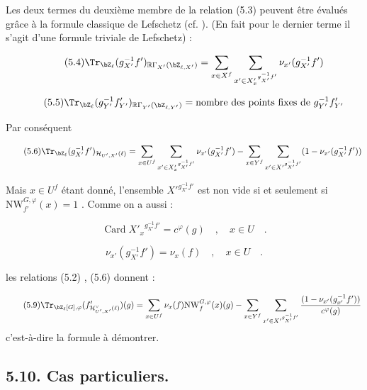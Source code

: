 Les deux termes du deuxième membre de la relation (5.3) peuvent être évalués grâce à la formule classique de Lefschetz (cf. ). (En fait pour le dernier terme il s'agit d'une formule triviale de Lefschetz) :

\begin{equation}\tag{5.4}
\Tr_{\bZ_\ell}(g_{X'}^{-1}f')_{\mathbb{R}\Gamma_{X'}(\bZ_{\ell,X'})} = \sum_{x \in X^f} \sum_{x' \in {X'_x}^{g_{X'}^{-1}f'}} \nu_{x'}(g_{X'}^{-1}f')
\end{equation}

\begin{equation}\tag{5.5}
\Tr_{\bZ_\ell}(g_{Y'}^{-1}f'_{Y'})_{\mathbb{R}\Gamma_{Y'}(\bZ_{\ell,Y'})} = \text{nombre des points fixes de } g_{Y'}^{-1}f'_{Y'}
\end{equation}

Par conséquent

\begin{equation}\tag{5.6}
\Tr_{\bZ_\ell}(g_{X'}^{-1}f')_{\mathcal{H}_{U',X'}(\ell)} = \sum_{x \in U^f} \sum_{x' \in {X'_x}^{g_{X'}^{-1}f'}} \nu_{x'}(g_{X'}^{-1}f') - \sum_{x \in Y^f} \sum_{x' \in {X'}^{g_{X'}^{-1}f'}} (1 - \nu_{x'}(g_{X'}^{-1}f'))
\end{equation}

Mais $x \in U^f$ étant donné, l'ensemble ${X'}^{g_{X'}^{-1}f'}$ est non vide si et seulement si $\mathrm{NW}_{f'}^{G,\varphi}(x) = 1$ . Comme on a aussi :

\begin{equation}\tag{5.7}
\operatorname{Card} {X'_x}^{g_{X'}^{-1}f'} = c^\varphi(g) \quad , \quad x \in U \quad .
\end{equation}

\begin{equation}\tag{5.8}
\nu_{x'}(g_{X'}^{-1}f') = \nu_x(f) \quad , \quad x \in U \quad .
\end{equation}

les relations (5.2) , (5.6) donnent :

\begin{equation}\tag{5.9}
\Tr_{\bZ_\ell[G],\varphi}(f'_{\mathcal{H}^\vee_{U',X'}(\ell)})(g) = \sum_{x \in U^f} \nu_x(f) \mathrm{NW}_f^{G,\varphi}(x)(g) - \sum_{x \in Y^f} \sum_{x' \in {X'}^{g_{X'}^{-1}f'}} \frac{(1 - \nu_{x'}(g_{x'}^{-1}f'))}{c^\varphi(g)}
\end{equation}
c'est-à-dire la formule à démontrer.

\subsection*{5.10. Cas particuliers.}
